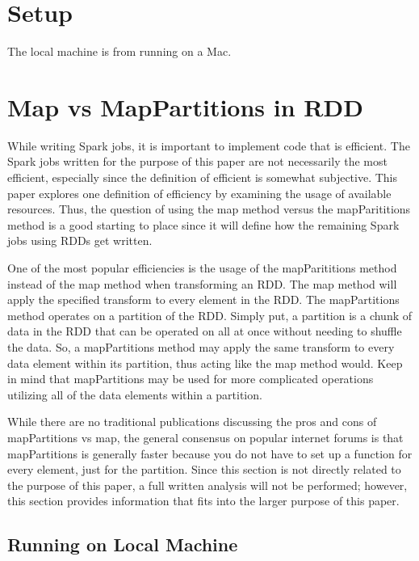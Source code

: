 \documentclass[conference]{IEEEtran}
\begin{document}
\section{Setup}
The local machine is from running on a Mac.

\section{Map vs MapPartitions in RDD}
While writing Spark jobs, it is important to implement code that is efficient.
The Spark jobs written for the purpose of this paper are not necessarily the most efficient, especially since the definition of efficient is somewhat subjective.
This paper explores one definition of efficiency by examining the usage of available resources.
Thus, the question of using the map method versus the mapParititions method is a good starting to place since it will define how the remaining Spark jobs using RDDs get written.

One of the most popular efficiencies is the usage of the mapParititions method instead of the map method when transforming an RDD.
The map method will apply the specified transform to every element in the RDD.
The mapPartitions method operates on a partition of the RDD.
Simply put, a partition is a chunk of data in the RDD that can be operated on all at once without needing to shuffle the data.
So, a mapPartitions method may apply the same transform to every data element within its partition, thus acting like the map method would.
Keep in mind that mapPartitions may be used for more complicated operations utilizing all of the data elements within a partition.

While there are no traditional publications discussing the pros and cons of mapPartitions vs map, the general consensus on popular internet forums is that mapPartitions is generally faster because you do not have to set up a function for every element, just for the partition.
Since this section is not directly related to the purpose of this paper, a full written analysis will not be performed; however, this section provides information that fits into the larger purpose of this paper.

\subsection{Running on Local Machine}
\end{document}

